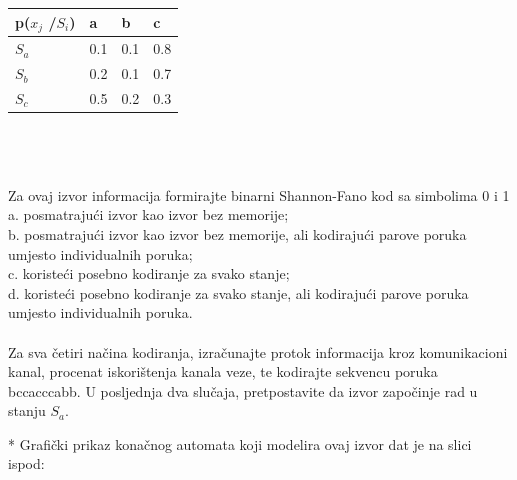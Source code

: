 \documentclass[12pt]{article}
\begin{document}
\begin{enumerate}
\begin{tabular}{|l|l|l|l|}
\hline
p($x_j$ /$S_i$) & a   & b   & c   \\ \hline
$S_a$        & 0.1 & 0.1 & 0.8 \\ \hline
$S_b$        & 0.2 & 0.1 & 0.7 \\ \hline
$S_c$        & 0.5 & 0.2 & 0.3 \\ \hline
\end{tabular}
\\
\\
\\
Za ovaj izvor informacija formirajte binarni Shannon-Fano kod sa simbolima 0 i 1 \\
a. posmatrajući izvor kao izvor bez memorije; \\
b. posmatrajući izvor kao izvor bez memorije, ali kodirajući parove poruka umjesto individualnih poruka; \\
c. koristeći posebno kodiranje za svako stanje; \\
d. koristeći posebno kodiranje za svako stanje, ali kodirajući parove poruka umjesto individualnih poruka. \\
\\
Za sva četiri načina kodiranja, izračunajte protok informacija kroz komunikacioni kanal, procenat iskorištenja kanala veze, te kodirajte sekvencu poruka bccacccabb. U posljednja dva slučaja, pretpostavite da izvor započinje rad u stanju $S_a$.

* Grafički prikaz konačnog automata koji modelira ovaj izvor dat je na slici
ispod: \\
\\
\end{enumerate}
\end{document}
